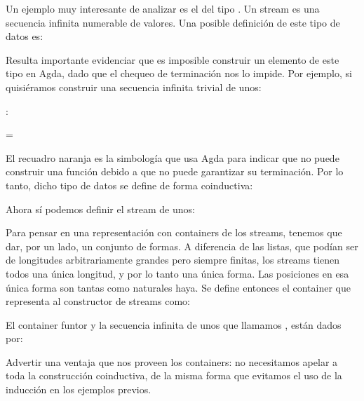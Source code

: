 \begin{example} \label{example:stream}Un ejemplo muy interesante de analizar es el del tipo . Un stream es una secuencia infinita numerable de valores. Una posible definición de este tipo de datos es:


Resulta importante evidenciar que es imposible construir un elemento de este tipo en Agda, dado que el chequeo de terminación nos lo impide. Por ejemplo, si quisiéramos construir una secuencia infinita trivial de unos:

\sangrar
{} :  \AgdaDatatype{$\Nat$}

\hspace{2.5ex}
 =  \AgdaInductiveConstructor{$::$} 

El recuadro naranja es la simbología que usa Agda para indicar que no puede construir una función debido a que no puede garantizar su terminación. 
Por lo tanto, dicho tipo de datos se define de forma coinductiva:


Ahora sí podemos definir el stream de unos:


Para pensar en una representación con containers de los streams, tenemos que dar, por un lado, un conjunto de formas. A diferencia de las listas, que podían ser de longitudes arbitrariamente grandes pero siempre finitas, los streams tienen todos una única longitud, y por lo tanto una única forma. Las posiciones en esa única forma son tantas como naturales haya. Se define entonces el container que representa al constructor de streams como:


El container funtor  y la secuencia infinita de unos que llamamos , están dados por:


Advertir una ventaja que nos proveen los containers: no necesitamos apelar a toda la construcción coinductiva, de la misma forma que evitamos el uso de la inducción en los ejemplos previos. %

\end{example}

